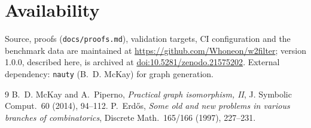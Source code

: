 \documentclass[11pt]{article}
\begin{document}
\section*{Availability}

Source, proofs (\texttt{docs/proofs.md}), validation targets, CI
configuration and the benchmark data are maintained at
\url{https://github.com/Whoneon/w2filter}; version 1.0.0, described
here, is archived at
\href{https://doi.org/10.5281/zenodo.21575202}{doi:10.5281/zenodo.21575202}.
External dependency: \texttt{nauty} (B.~D. McKay) for graph
generation.

\begin{thebibliography}{9}
 B.~D. McKay and A.~Piperno,
\emph{Practical graph isomorphism, II},
J. Symbolic Comput.\ 60 (2014), 94--112.
 P.~Erd\H{o}s,
\emph{Some old and new problems in various branches of
combinatorics}, Discrete Math.\ 165/166 (1997), 227--231.
\end{thebibliography}
\end{document}
